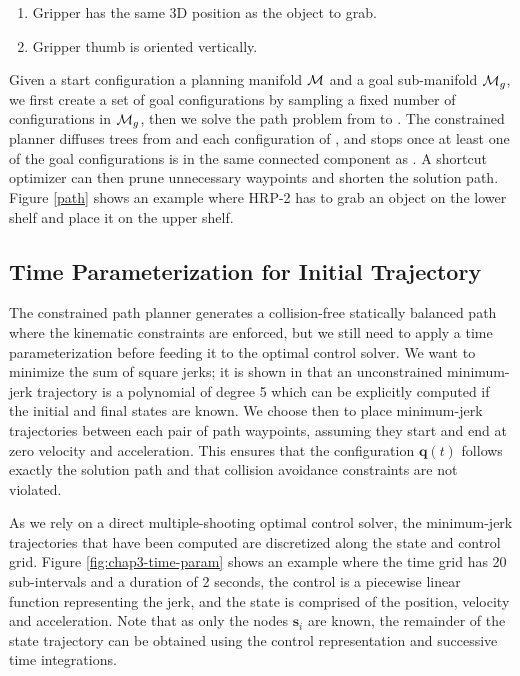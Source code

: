 \begin{enumerate}
  \item Gripper has the same 3D position as the object to grab.
  \item Gripper thumb is oriented vertically.
\end{enumerate}

Given a start configuration  a planning manifold $\mathcal{M}$
and a goal sub-manifold $\mathcal{M}_{g}$, we first create a set of goal
configurations  by sampling a fixed number of configurations
in $\mathcal{M}_{g}$, then we solve the path problem from  to
. The constrained planner diffuses trees from  and
each configuration of , and stops once at least one of the
goal configurations is in the same connected component as
. A shortcut optimizer can then prune unnecessary waypoints
and shorten the solution path. Figure \ref{path} shows an example
where HRP-2 has to grab an object on the lower shelf and place it on
the upper shelf.

\subsection{Time Parameterization for Initial Trajectory}
\label{subsec:chap3-time-parameterization}

The constrained path planner generates a collision-free statically
balanced path where the kinematic constraints are enforced, but we
still need to apply a time parameterization before feeding it to the
optimal control solver. We want to minimize the sum of square jerks;
it is shown in \cite{Flash1985} that an unconstrained minimum-jerk
trajectory is a polynomial of degree 5 which can be explicitly
computed if the initial and final states are known. We choose then to
place minimum-jerk trajectories between each pair of path waypoints,
assuming they start and end at zero velocity and acceleration. This
ensures that the configuration $\mathbf{q}(t)$ follows exactly the
solution path and that collision avoidance constraints are not
violated.

As we rely on a direct multiple-shooting optimal control solver, the
minimum-jerk trajectories that have been computed are discretized
along the state and control grid. Figure \ref{fig:chap3-time-param}
shows an example where the time grid has 20 sub-intervals and a
duration of 2 seconds, the control is a piecewise linear function
representing the jerk, and the state is comprised of the position,
velocity and acceleration. Note that as only the nodes $\mathbf{s}_i$
are known, the remainder of the state trajectory can be obtained using
the control representation and successive time integrations.

